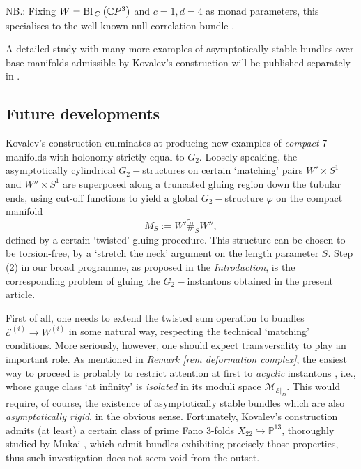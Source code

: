 \documentclass{article}
\newcommand{\tsum}{\tilde\#_S}
\newcommand{\ii}{^{(i)}}
\newcommand{\func}[1]{\textnormal {#1\,}}
\newcommand{\pp}{\mathbb{P}}
\newcommand{\mc}[1]{\mathcal{#1}}
\begin{document}
\noindent NB.: Fixing  $\bar{W}=\func{Bl}_{C}\left(\mathbb{C}P^{3}\right)$ and $c=1, d=4$ as monad parameters, this specialises to the well-known null-correlation bundle \cite{Okonek-Spindler-Schneider}\cite{Barth}.

A detailed study with many more examples of asymptotically stable bundles over base manifolds admissible by Kovalev's construction  will be published separately in \cite{FAE}.

\subsection{Future developments}
\label{subsec preview}
Kovalev's construction culminates at producing new examples of \emph{ compact} 7-manifolds with holonomy strictly equal to $G_2$. Loosely speaking, the asymptotically cylindrical  $G_{2}-$structures on certain `matching' pairs $W'\times S^1$ and $W''\times S^1$ are superposed along a truncated gluing region down the tubular ends, using cut-off functions to yield a global 
$G_{2}-$structure $\varphi $ on the compact manifold 
\begin{displaymath}
        M_S:= W'\tsum W'',
\end{displaymath}
defined by a certain `twisted' gluing procedure. This structure can be chosen to be torsion-free,
by a `stretch the neck' argument on the length parameter $S$. Step (2) in our broad programme, as proposed in the \emph{Introduction}, is the corresponding problem of gluing the $G_2-$instantons obtained in the present article. 

First of all, one needs to extend the twisted sum operation to bundles $\mc{E}\ii\to W\ii$ in some natural way, respecting the technical `matching' conditions.
More seriously, however, one should expect transversality to 
play an important role. As mentioned in \emph{Remark \ref{rem deformation complex}}, the easiest way to proceed  is probably to restrict
attention at first to \emph{acyclic }instantons \cite[p.25]{floer},
i.e., whose gauge class `at infinity' is \emph{isolated} in its moduli space $%
\mathcal{M}_{\left. \mathcal{E}\right\vert _{D}}$. 
This would require, of course,
the existence of asymptotically stable bundles which are also \emph{asymptotically rigid}, in the obvious sense. Fortunately, Kovalev's construction admits (at least) a certain class of prime  Fano 3-folds  $X_{22}\hookrightarrow\pp^{13}$, thoroughly studied by Mukai   \cite[\S3]{MukaiFano3-folds}\cite[\S3]{MukaiBundlesOfK3}, which admit bundles exhibiting precisely  those properties, thus such investigation does not seem  void from the outset.
\end{document}
